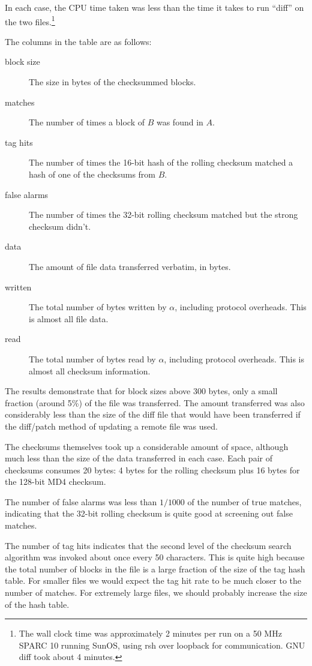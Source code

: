 \documentclass[a4paper]{article}
\begin{document}
In each case, the CPU time taken was less than the
time it takes to run ``diff'' on the two files.\footnote{The wall
  clock time was approximately 2 minutes per run on a 50 MHz SPARC 10
  running SunOS, using rsh over loopback for communication.  GNU diff
  took about 4 minutes.}

The columns in the table are as follows:

\begin{description}
\item [block size] The size in bytes of the checksummed blocks.
\item [matches] The number of times a block of $B$ was found in $A$.
\item [tag hits] The number of times the 16-bit hash of the rolling
  checksum matched a hash of one of the checksums from $B$.
\item [false alarms] The number of times the 32-bit rolling checksum
  matched but the strong checksum didn't.
\item [data] The amount of file data transferred verbatim, in bytes.
\item [written] The total number of bytes written by $\alpha$,
  including protocol overheads. This is almost all file data.
\item [read] The total number of bytes read by $\alpha$, including
  protocol overheads. This is almost all checksum information.
\end{description}

The results demonstrate that for block sizes above 300 bytes, only a
small fraction (around 5\%) of the file was transferred. The amount
transferred was also considerably less than the size of the diff file
that would have been transferred if the diff/patch method of updating
a remote file was used.

The checksums themselves took up a considerable amount of space,
although much less than the size of the data transferred in each
case. Each pair of checksums consumes 20 bytes: 4 bytes for the
rolling checksum plus 16 bytes for the 128-bit MD4 checksum.

The number of false alarms was less than $1/1000$ of the number of
true matches, indicating that the 32-bit rolling checksum is quite
good at screening out false matches. 

The number of tag hits indicates that the second level of the
checksum search algorithm was invoked about once every 50
characters.  This is quite high because the total number of blocks in
the file is a large fraction of the size of the tag hash table. For
smaller files we would expect the tag hit rate to be much closer to
the number of matches.  For extremely large files, we should probably
increase the size of the hash table.
\end{document}
